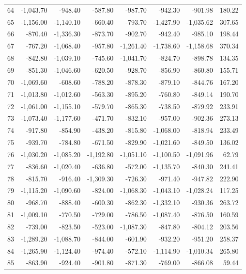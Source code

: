 \begin{longtable}{rrrrrrrr}
64 & -1,043.70 & -948.40 & -587.80 & -987.70 & -942.30 & -901.98 & 180.22  \\
65 & -1,156.00 & -1,140.10 & -660.40 & -793.70 & -1,427.90 & -1,035.62 & 307.65  \\
66 & -870.40 & -1,336.30 & -873.70 & -902.70 & -942.40 & -985.10 & 198.44  \\
67 & -767.20 & -1,068.40 & -957.80 & -1,261.40 & -1,738.60 & -1,158.68 & 370.34  \\
68 & -842.80 & -1,039.10 & -745.60 & -1,041.70 & -824.70 & -898.78 & 134.35  \\
69 & -851.30 & -1,046.60 & -620.50 & -928.70 & -856.90 & -860.80 & 155.71  \\
70 & -1,069.60 & -608.60 & -788.20 & -878.30 & -879.10 & -844.76 & 167.20  \\
71 & -1,013.80 & -1,012.60 & -563.30 & -895.20 & -760.80 & -849.14 & 190.70  \\
72 & -1,061.00 & -1,155.10 & -579.70 & -865.30 & -738.50 & -879.92 & 233.91  \\
73 & -1,073.40 & -1,177.60 & -471.70 & -832.10 & -957.00 & -902.36 & 273.13  \\
74 & -917.80 & -854.90 & -438.20 & -815.80 & -1,068.00 & -818.94 & 233.49  \\
75 & -939.70 & -784.80 & -671.50 & -829.90 & -1,021.60 & -849.50 & 136.02  \\
76 & -1,030.20 & -1,085.20 & -1,192.80 & -1,051.10 & -1,100.50 & -1,091.96 & 62.79  \\
77 & -836.60 & -1,020.40 & -636.80 & -572.00 & -1,135.70 & -840.30 & 241.41  \\
78 & -815.70 & -916.40 & -1,309.30 & -726.30 & -971.40 & -947.82 & 222.90  \\
79 & -1,115.20 & -1,090.60 & -824.00 & -1,068.30 & -1,043.10 & -1,028.24 & 117.25  \\
80 & -968.70 & -888.40 & -600.30 & -862.30 & -1,332.10 & -930.36 & 263.72  \\
81 & -1,009.10 & -770.50 & -729.00 & -786.50 & -1,087.40 & -876.50 & 160.59  \\
82 & -739.00 & -823.50 & -523.00 & -1,087.30 & -847.80 & -804.12 & 203.56  \\
83 & -1,289.20 & -1,088.70 & -844.00 & -601.90 & -932.20 & -951.20 & 258.37  \\
84 & -1,265.90 & -1,124.40 & -974.40 & -572.10 & -1,114.90 & -1,010.34 & 265.80  \\
85 & -863.90 & -924.40 & -901.80 & -871.30 & -769.00 & -866.08 & 59.44  \\

\end{longtable}
